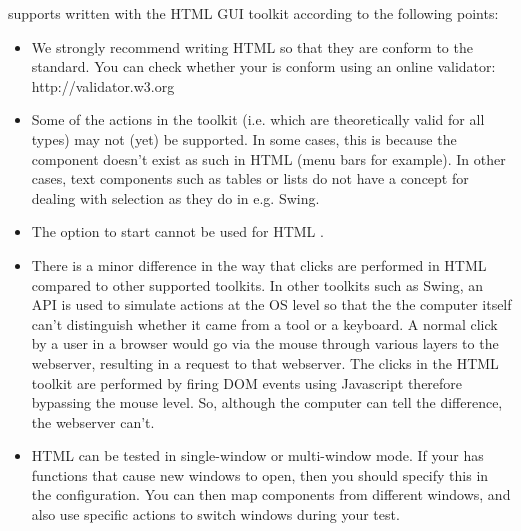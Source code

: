 \app{} supports \gdauts{} written with the HTML GUI toolkit according to the following points:

\begin{itemize}
\item We strongly recommend writing HTML \gdauts{} so that they are conform to the  standard. You can check whether your \gdaut{} is  conform using an online validator: http://validator.w3.org
\item Some of the \app{} actions in the  toolkit (i.e. which are theoretically valid for all \gdaut{} types) may not (yet) be supported. In some cases, this is because the component doesn't exist as such in HTML \gdauts{} (menu bars for example). In other cases, text components such as tables or lists do not have a concept for dealing with selection as they do in e.g. Swing. 
\item The  option to start \gdauts{}  cannot be used for HTML \gdauts{}. 
\item There is a minor difference in the way that clicks are performed in HTML compared to other supported toolkits. In other toolkits such as Swing, an API is used to simulate actions at the OS level so that the the computer itself can't distinguish whether it came from a tool or a keyboard. A normal click by a user in a browser would go via the mouse through various layers to the webserver, resulting in a request to that webserver. The clicks in the HTML toolkit are performed by firing DOM events using Javascript therefore bypassing the mouse level. So, although the computer can tell the difference, the webserver can't. 
\item HTML \gdauts{} can be tested in single-window or multi-window mode. If your \gdaut{} has functions that cause new windows to open, then you should specify this in the \gdaut{} configuration. You can then map components from different windows, and also use specific actions to switch windows during your test. 
\end{itemize}

